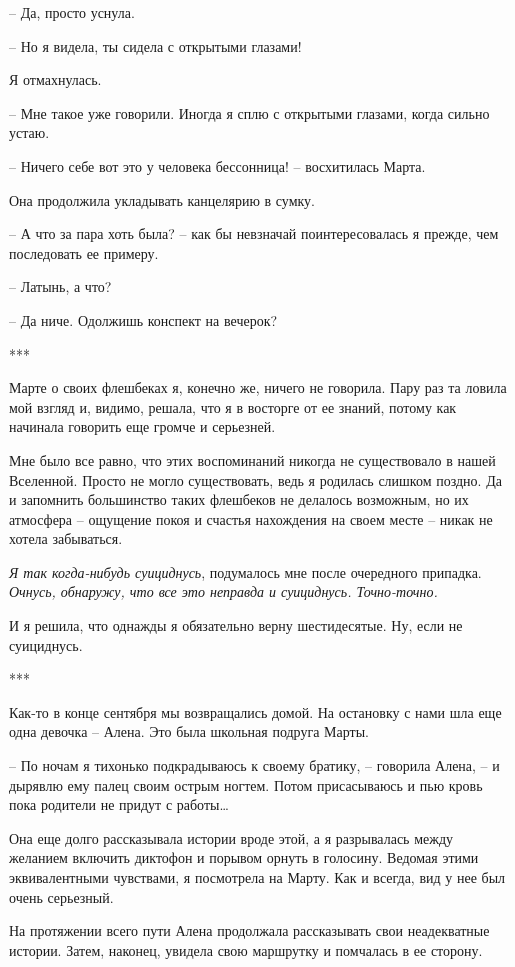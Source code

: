 \documentclass[
]{book}
\begin{document}
-- Да, просто уснула.

-- Но я видела, ты сидела с открытыми глазами!

Я отмахнулась.

-- Мне такое уже говорили. Иногда я сплю с открытыми глазами, когда сильно устаю.

-- Ничего себе вот это у человека бессонница! -- восхитилась Марта.

Она продолжила укладывать канцелярию в сумку.

-- А что за пара хоть была? -- как бы невзначай поинтересовалась я прежде, чем последовать ее примеру.

-- Латынь, а что?

-- Да ниче. Одолжишь конспект на вечерок?

***

Марте о своих флешбеках я, конечно же, ничего не говорила. Пару раз та ловила мой взгляд и, видимо, решала, что я в восторге от ее знаний, потому как начинала говорить еще громче и серьезней.

Мне было все равно, что этих воспоминаний никогда не существовало в нашей Вселенной. Просто не могло существовать, ведь я родилась слишком поздно. Да и запомнить большинство таких флешбеков не делалось возможным, но их атмосфера -- ощущение покоя и счастья нахождения на своем месте -- никак не хотела забываться.

\emph{Я так когда-нибудь суициднусь}, подумалось мне после очередного припадка. \emph{Очнусь, обнаружу, что все это неправда и суициднусь. Точно-точно.}

И я решила, что однажды я обязательно верну шестидесятые. Ну, если не суициднусь.

***

Как-то в конце сентября мы возвращались домой. На остановку с нами шла еще одна девочка -- Алена. Это была школьная подруга Марты.

-- По ночам я тихонько подкрадываюсь к своему братику, -- говорила Алена, -- и дырявлю ему палец своим острым ногтем. Потом присасываюсь и пью кровь пока родители не придут с работы\ldots{}

Она еще долго рассказывала истории вроде этой, а я разрывалась между желанием включить диктофон и порывом орнуть в голосину. Ведомая этими эквивалентными чувствами, я посмотрела на Марту. Как и всегда, вид у нее был очень серьезный.

На протяжении всего пути Алена продолжала рассказывать свои неадекватные истории. Затем, наконец, увидела свою маршрутку и помчалась в ее сторону.
\end{document}
